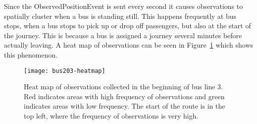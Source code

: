 Since the ObservedPositionEvent is sent every second it causes
observations to spatially cluster when a bus is standing still. This
happens frequently at bus stops, when a bus stops to pick up or drop
off passengers, but also at the start of the journey. This is because
a bus is assigned a journey several minutes before actually
leaving. A heat map of observations can be seen in
Figure~\ref{fig:bus203-heatmap} which shows this phenomenon.

\begin{figure}
  \centering
  \texttt{[image: bus203-heatmap]}
  \caption{Heat map of observations collected in the beginning of bus line 3. 
    Red indicates areas with high frequency of observations and green indicates areas with
    low frequency. The start of the route is in the top left, where
    the frequency of observations is very high. }\label{fig:bus203-heatmap}
\end{figure}




